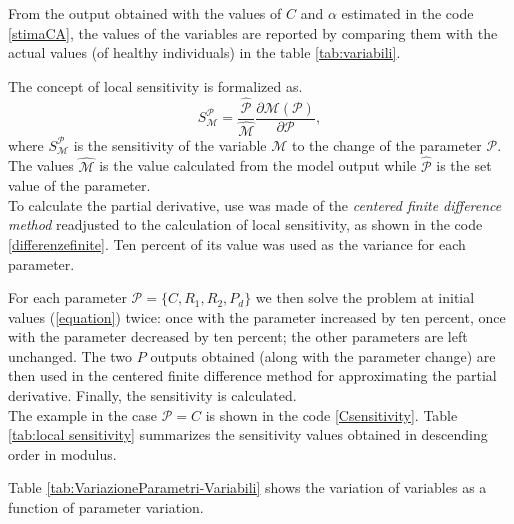 \newpage

From the output obtained with the values of $C$ and $\alpha$ estimated in the code \ref{stimaCA}, the values of the variables are reported by comparing them with the actual values (of healthy individuals) in the table \ref{tab:variabili}.



The concept of local sensitivity is formalized as.
\[
S_\mathcal{M}^\mathcal{P}=\frac{\hat{\mathcal{P}}}{\hat{\mathcal{M}}} \frac{\partial \mathcal{M}(\mathcal{P})}{\partial \mathcal{P}},
\]
where $S_\mathcal{M}^\mathcal{P}$ is the sensitivity of the variable $\mathcal{M}$ to the change of the parameter $\mathcal{P}$. The values $\hat{\mathcal{M}}$ is the value calculated from the model output while $\hat{\mathcal{P}}$ is the set value of the parameter.\\

To calculate the partial derivative, use was made of the \textit{centered finite difference method} readjusted to the calculation of local sensitivity, as shown in the code \ref{differenzefinite}. Ten percent of its value was used as the variance for each parameter.

For each parameter $\mathcal{P}=\{C,R_1,R_2,P_d\}$ we then solve the problem at initial values (\ref{equation}) twice: once with the parameter increased by ten percent, once with the parameter decreased by ten percent; the other parameters are left unchanged. The two $P$ outputs obtained (along with the parameter change) are then used in the centered finite difference method for approximating the partial derivative. Finally, the sensitivity is calculated. \\
The example in the case $\mathcal{P}=C$ is shown in the code \ref{Csensitivity}.
Table \ref{tab:local sensitivity} summarizes the sensitivity values obtained in descending order in modulus.



Table \ref{tab:VariazioneParametri-Variabili} shows the variation of variables as a function of parameter variation.

\newpage



